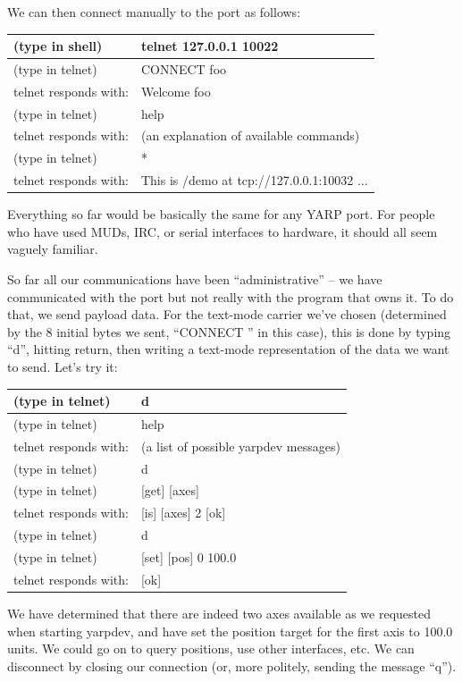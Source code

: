 We can then connect manually to the port as follows:

\begin{tabular}{|l|l|}
\hline
(type in shell) & telnet 127.0.0.1 10022 \\
\hline
(type in telnet) & CONNECT foo \\
\hline
telnet responds with: & Welcome foo \\
\hline
(type in telnet) & help \\
\hline
telnet responds with: & (an explanation of available commands) \\
\hline
(type in telnet) & * \\
\hline
telnet responds with: & This is /demo at tcp://127.0.0.1:10032 ... \\
\hline
\end{tabular}

Everything so far would be basically the same for any YARP port.
For people who have used MUDs, IRC, or serial interfaces to hardware,
it should all seem vaguely familiar.

So far all our communications have been ``administrative'' --
we have communicated with the port but not really with the 
program that owns it.  To do that, we send payload data.  For the
text-mode carrier we've chosen (determined by the 8 initial
bytes we sent, ``CONNECT '' in this case), this is done by typing
``d'', hitting return, then writing a text-mode representation of
the data we want to send.  Let's try it:

\begin{tabular}{|l|l|}
\hline
(type in telnet) & d \\
\hline
(type in telnet) & help \\
\hline
telnet responds with: & (a list of possible yarpdev messages)\\
\hline
(type in telnet) & d \\
\hline
(type in telnet) & [get] [axes] \\
\hline
telnet responds with: & [is] [axes] 2 [ok] \\
\hline
(type in telnet) & d \\
\hline
(type in telnet) & [set] [pos] 0 100.0 \\
\hline
telnet responds with: & [ok] \\
\hline

\end{tabular}

We have determined that there are indeed two axes available as we requested
when starting yarpdev, and have set the position target for the
first axis to 100.0 units.  We could go on to query positions, use
other interfaces, etc.  We can disconnect by closing our connection
(or, more politely, sending the message ``q'').

